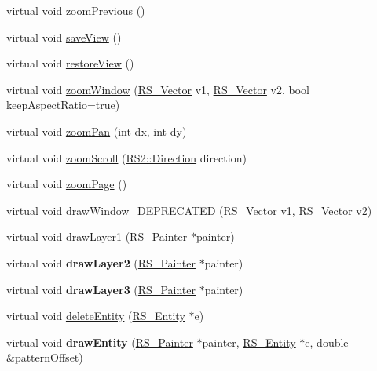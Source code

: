 \begin{DoxyCompactItemize}
\item 
virtual void \hyperlink{classRS__GraphicView_acdd3a4e854454a38fb543b076cb356ef}{zoom\-Previous} ()
\item 
virtual void \hyperlink{classRS__GraphicView_a976312ee30b110f2ee08af4cf74484b2}{save\-View} ()
\item 
virtual void \hyperlink{classRS__GraphicView_a1946bd7459d40ef47183f8d42f39c87f}{restore\-View} ()
\item 
virtual void \hyperlink{classRS__GraphicView_a4726f4b18f36529c9dcbc802bdb4640c}{zoom\-Window} (\hyperlink{classRS__Vector}{R\-S\-\_\-\-Vector} v1, \hyperlink{classRS__Vector}{R\-S\-\_\-\-Vector} v2, bool keep\-Aspect\-Ratio=true)
\item 
virtual void \hyperlink{classRS__GraphicView_af86581c53c7c9377e84310df22ed93a0}{zoom\-Pan} (int dx, int dy)
\item 
virtual void \hyperlink{classRS__GraphicView_a2ba37b0e8c6e322fc2a420c9589a4bae}{zoom\-Scroll} (\hyperlink{classRS2_a6b01552307ddf2599503c2e2f6ae7066}{R\-S2\-::\-Direction} direction)
\item 
virtual void \hyperlink{classRS__GraphicView_a18ab12a02cb250eab2369ea8db016525}{zoom\-Page} ()
\item 
virtual void \hyperlink{classRS__GraphicView_a0ac9a280b3b288bf866c54f1053ff066}{draw\-Window\-\_\-\-D\-E\-P\-R\-E\-C\-A\-T\-E\-D} (\hyperlink{classRS__Vector}{R\-S\-\_\-\-Vector} v1, \hyperlink{classRS__Vector}{R\-S\-\_\-\-Vector} v2)
\item 
virtual void \hyperlink{classRS__GraphicView_a435f574511a0ad56c604585c2a9d63df}{draw\-Layer1} (\hyperlink{classRS__Painter}{R\-S\-\_\-\-Painter} $\ast$painter)
\item 
\hypertarget{classRS__GraphicView_a4e081d7ba65a970c4dcc8281a01b035c}{virtual void {\bfseries draw\-Layer2} (\hyperlink{classRS__Painter}{R\-S\-\_\-\-Painter} $\ast$painter)}\label{classRS__GraphicView_a4e081d7ba65a970c4dcc8281a01b035c}

\item 
\hypertarget{classRS__GraphicView_aeb49db46c148fc0a682a1034b8963953}{virtual void {\bfseries draw\-Layer3} (\hyperlink{classRS__Painter}{R\-S\-\_\-\-Painter} $\ast$painter)}\label{classRS__GraphicView_aeb49db46c148fc0a682a1034b8963953}

\item 
virtual void \hyperlink{classRS__GraphicView_ad167e9a2983c936cde0a1fc45c20dde2}{delete\-Entity} (\hyperlink{classRS__Entity}{R\-S\-\_\-\-Entity} $\ast$e)
\item 
\hypertarget{classRS__GraphicView_a23fd4600a87782e836949bdab4b57507}{virtual void {\bfseries draw\-Entity} (\hyperlink{classRS__Painter}{R\-S\-\_\-\-Painter} $\ast$painter, \hyperlink{classRS__Entity}{R\-S\-\_\-\-Entity} $\ast$e, double \&pattern\-Offset)}\label{classRS__GraphicView_a23fd4600a87782e836949bdab4b57507}


\end{DoxyCompactItemize}

